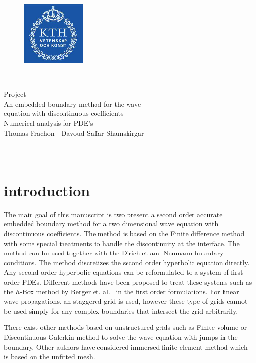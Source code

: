 \documentclass[10pt,a4paper,twoside, french]{article}
\numberwithin{equation}{section}
\numberwithin{figure}{section}
\numberwithin{table}{section}
\begin{document}
\begin{figure}[h]
\centering
\includegraphics[scale=.5]{fig/kth}
\vspace{-1.5cm}
\end{figure}
	\vspace{1cm}    
    \begin{center}
       		\rule{10cm}{1pt} \\[0.6cm]         %
        	{\huge Project \\[0.2cm]
        	\Large An embedded boundary method for the wave \\
        	equation with discontinuous coefficients \\[0.2cm]
         \Large  Numerical analysis for PDE's\\[0.2cm] 
          \large Thomas Frachon - Davoud Saffar Shamshirgar}  \\[0.6cm]
    		\rule{10cm}{1pt} \\[0.5cm]  
	\end{center}    
	
\section{introduction}
The main goal of this manuscript is two present a second order accurate embedded boundary method for a two dimensional wave equation with discontinuous coefficients. The method is based on the Finite difference method with some special treatments to handle the discontinuity at the interface. The method can be used together with the Dirichlet and Neumann boundary conditions. The method discretizes the second order hyperbolic equation directly. Any second order hyperbolic equations can be reformulated to a system of first order PDEs. Different methods have been proposed to treat these systems such as the $h$-Box method by Berger et. al.\ \cite{berger} in the first order formulations. For linear wave propagations, an staggered grid is used, however these type of grids cannot be used simply for any complex boundaries that intersect the grid arbitrarily. 

There exist other methods based on unstructured grids such as Finite volume or Discontinuous Galerkin method to solve the wave equation with jumps in the boundary. Other authors have considered immersed finite element method which is based on the unfitted mesh.
\end{document}
